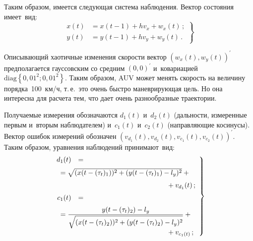 \begin{multicols}{2}
     Таким образом, имеется сле\-ду\-ющая сис\-те\-ма наблюде\-ния. Век\-тор 
со\-сто\-яния име\-ет~вид:
     \begin{equation}
     \left.
     \begin{array}{rl}
     x(t)&= x(t-1)+hv_x+w_x(t)\,;\\[6pt]
     y(t)&= y(t-1)+hv_y +w_y(t)\,.
     \end{array}
     \right\}
     \label{e6-bos}
     \end{equation}
     
     Описывающий хаотичные изменения ско\-рости вектор $\left( w_x(t), w_y(t)\right)^\prime$ 
     предполагается гауссовским со сред\-ним $(0,0)^\prime$ 
и~ковариацией $\mathrm{diag}\left\{ 0{,}01^2; 0{,}01^2\right\}$. Таким 
образом, AUV может менять ско\-рость на величину по\-ряд\-ка~100~км/ч, 
т.\,е.\ это очень быст\-ро маневрирующая цель. Но она интересна для рас\-че\-та 
тем, что дает очень разнообразные тра\-ек\-то\-рии.
{

}
     
     Получаемые измерения обозначаются $d_1(t)$ и~$d_2(t)$ (даль\-ности, 
измеренные пер\-вым и~вторым наблюдателем) и~$c_1(t)$ и~$c_2(t)$ 
(на\-прав\-ля\-ющие косинусы). Век\-тор ошибок измерений обозначен 
     $\left( v_{d_1}(t), v_{d_2}(t), v_{c_1}(t), v_{c_2}(t)\right)^\prime$. 
Таким образом, урав\-не\-ния наблюдений при\-ни\-ма\-ют~вид:
     \begin{equation}
     \left.
     \begin{array}{rl}
     d_1(t)&= {}\\[6pt]
& \hspace*{-10mm}    {}=\sqrt{(x(t-(\tau_t)_1))^2 +(y(t-(\tau_t)_1)-l_y)^2} +{}\\[6pt]
&\hspace*{45mm}{}+v_{d_1}(t)\,;\\[6pt]
c_1(t)&={}\\[6pt]
& \hspace*{-10mm}     {}= \fr{y(t-(\tau_t)_2)-l_y}{\sqrt{(x(t-(\tau_t)_2))^2 +(y(t-(\tau_t)_2)-l_y)^2}}+{}\\[6pt]
&\hspace*{45mm}{}+v_{c_1(t)}\,;
\end{array}
\right\}
\label{e7-1-bos}
\end{equation}


\end{multicols}
